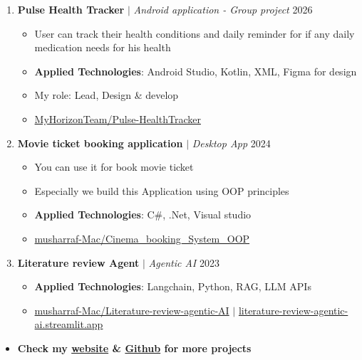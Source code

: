 \documentclass[10pt,a4paper]{article}
\newcommand{\project}[3]{%
  \textbf{#1} $|$ \textit{#2} \hfill #3}
\begin{document}
\begin{enumerate}[resume]
  \item \project{Pulse Health Tracker}{Android application - Group project}{2026}
   \begin{itemize}
    \item User can track their health conditions and daily reminder for if any daily medication needs for his health
    \item \textbf{Applied Technologies}: Android Studio, Kotlin, XML, Figma for design
    \item My role: Lead, Design \& develop
    \item \faGithub \href{https://github.com/MyHorizonTeam/Pulse-HealthTracker}{ MyHorizonTeam/Pulse-HealthTracker}
   \end{itemize}

  \item \project{Movie ticket booking application}{Desktop App}{2024}
   \begin{itemize}
    \item You can use it for book movie ticket
    \item Especially we build this Application using OOP principles 
    \item \textbf{Applied Technologies}: C\#, .Net, Visual studio 
    \item \faGithub \href{https://github.com/musharraf-Mac/Cinema_booking_System_OOP}{ musharraf-Mac/Cinema\_booking\_System\_OOP}
   \end{itemize}
   \item \project{Literature review Agent}{Agentic AI}{2023}
   \begin{itemize}
    \item \textbf{Applied Technologies}: Langchain, Python, RAG, LLM APIs
    \item \faGithub \href{https://github.com/musharraf-Mac/Literature-review-agentic-AI}{ musharraf-Mac/Literature-review-agentic-AI} \hspace{0.2cm} $|$ \hspace{0.2cm} \faLink \href{https://literature-review-agentic-ai.streamlit.app/}{ literature-review-agentic-ai.streamlit.app}
   \end{itemize}
\end{enumerate}
\begin{itemize}
  \item \textbf{Check my \href{https://armusharraf.me}{\textcolor{accent}{website}} \& \href{https://github.com/musharraf-Mac}{\textcolor{accent}{Github}} for more projects}
\end{itemize}
\end{document}
